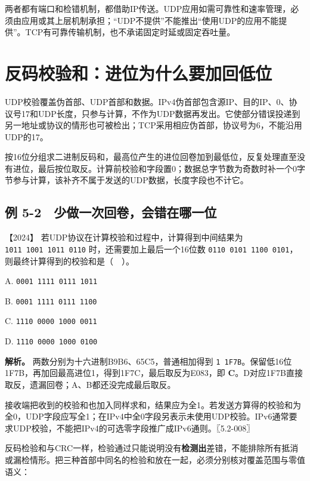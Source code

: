 两者都有端口和检错机制，都借助IP传送。UDP应用如需可靠性和速率管理，必须由应用或其上层机制承担；``UDP不提供''不能推出``使用UDP的应用不能提供''。TCP有可靠传输机制，也不承诺固定时延或固定吞吐量。

\section{反码校验和：进位为什么要加回低位}\label{cn-05-03}

UDP校验覆盖伪首部、UDP首部和数据。IPv4伪首部包含源IP、目的IP、0、协议号17和UDP长度，只参与计算，不作为UDP数据再发出。它使部分错误投递到另一地址或协议的情形也可被检出；TCP采用相应伪首部，协议号为6，不能沿用UDP的17。

按16位分组求二进制反码和，最高位产生的进位回卷加到最低位，反复处理直至没有进位，最后按位取反。计算前校验和字段置0；数据总字节数为奇数时补一个0字节参与计算，该补齐不属于发送的UDP数据，长度字段也不计它。

\subsection{例 5-2　少做一次回卷，会错在哪一位}\label{cn-ex5-2}

\noindent{}【2024】 若UDP协议在计算校验和过程中，计算得到中间结果为 \allowbreak{}\texttt{1011\ 1001\ 1011\ 0110} 时，还需要加上最后一个16位数 \allowbreak{}\texttt{0110\ 0101\ 1100\ 0101}，则最终计算得到的校验和是（　）。

A. \allowbreak{}\texttt{0001\ 1111\ 0111\ 1011}

B. \allowbreak{}\texttt{0001\ 1111\ 0111\ 1100}

C. \allowbreak{}\texttt{1110\ 0000\ 1000\ 0011}

D. \allowbreak{}\texttt{1110\ 0000\ 1000\ 0100}


\textbf{解析。} 两数分别为十六进制B9B6、65C5，普通相加得到 \allowbreak{}\texttt{1\ 1F7B}。保留低16位1F7B，再加回最高进位1，得到1F7C，最后取反为E083，即 \textbf{C}。D对应1F7B直接取反，遗漏回卷；A、B都还没完成最后取反。

接收端把收到的校验和也加入同样求和，结果应为全1。若发送方算得的校验和为全0，UDP字段应写全1；在IPv4中全0字段另表示未使用UDP校验。IPv6通常要求UDP校验，不能把IPv4的可选零字段推广成IPv6通则。〖5.2-008〗

反码检验和与CRC一样，检验通过只能说明没有\textbf{检测出}差错，不能排除所有抵消或漏检情形。把三种首部中同名的检验和放在一起，必须分别核对覆盖范围与零值语义：

